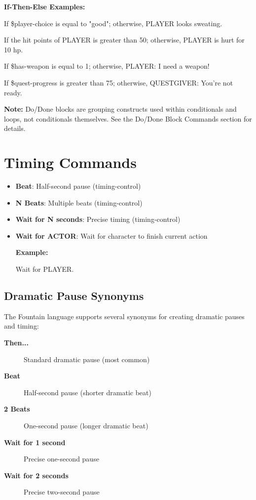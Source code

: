 \documentclass[11pt,letterpaper,oldstylefigures]{memoir}
\newcommand{\stagedir}[1]{#1\par\vspace{1\baselineskip}}
\newenvironment{FountainExample}
  {\begingroup
  \ttfamily\small
   \setlength{\parindent}{0pt}
  \setlength{\parskip}{0.5em}
  \allowdisplaybreaks
  \setlength{\displaywidowpenalty}{0}
  \setlength{\widowpenalty}{0}
  \setlength{\clubpenalty}{0}
  \setlength{\interlinepenalty}{0}
}
  {\endgroup}
\newcommand{\fountain}[1]{\textbf{#1}}
\begin{document}
\begin{itemize}
\textbf{If-Then-Else Examples:}
\begin{FountainExample}
\stagedir{If \$player-choice is equal to "good"; otherwise, PLAYER looks sweating.}
\stagedir{If the hit points of PLAYER is greater than 50; otherwise, PLAYER is hurt for 10 hp.}
\stagedir{If \$has-weapon is equal to 1; otherwise, PLAYER: I need a weapon!}
\stagedir{If \$quest-progress is greater than 75; otherwise, QUESTGIVER: You're not ready.}
\end{FountainExample}
\end{itemize}

\textbf{Note:} Do/Done blocks are grouping constructs used within conditionals and loops, not conditionals themselves. See the Do/Done Block Commands section for details.

\section{Timing Commands}
\begin{itemize}
\item \fountain{Beat}: Half-second pause (\gls{timing-control})
\item \fountain{N Beats}: Multiple beats (\gls{timing-control})
\item \fountain{Wait for N seconds}: Precise timing (\gls{timing-control})
\item \fountain{Wait for ACTOR}: Wait for character to finish current action

\textbf{Example:}
\begin{FountainExample}
\stagedir{Wait for PLAYER.}
\end{FountainExample}
\end{itemize}

\subsection{Dramatic Pause Synonyms}

The Fountain language supports several synonyms for creating dramatic pauses and timing:

\begin{description}
\item[\fountain{Then...}] Standard dramatic pause (most common)
\item[\fountain{Beat}] Half-second pause (shorter dramatic beat)
\item[\fountain{2 Beats}] One-second pause (longer dramatic beat)
\item[\fountain{Wait for 1 second}] Precise one-second pause
\item[\fountain{Wait for 2 seconds}] Precise two-second pause
\end{description}
\end{document}
